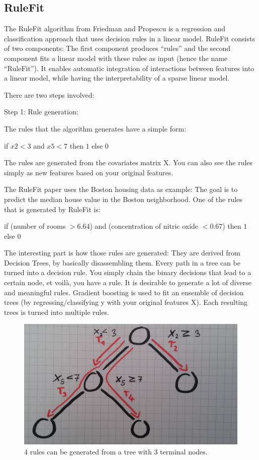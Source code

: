 \documentclass[12pt,]{krantz}
\theoremstyle{definition}
\theoremstyle{definition}
\theoremstyle{definition}
\theoremstyle{remark}
\begin{document}
\subsection{RuleFit}\label{rulefit}

The RuleFit algorithm from Friedman and Propescu
\citep{friedman2008predictive} is a regression and classification
approach that uses decision rules in a linear model. RuleFit consists of
two components: The first component produces ``rules'' and the second
component fits a linear model with these rules as input (hence the name
``RuleFit''). It enables automatic integration of interactions between
features into a linear model, while having the interpretability of a
sparse linear model.

There are two steps involved:

Step 1: Rule generation:

The rules that the algorithm generates have a simple form:

if \(x2 < 3\) and \(x5 < 7\) then \(1\) else \(0\)

The rules are generated from the covariates matrix X. You can also see
the rules simply as new features based on your original features.

The RuleFit paper uses the Boston housing data as example: The goal is
to predict the median house value in the Boston neighborhood. One of the
rules that is generated by RuleFit is:

if (number of rooms \(> 6.64\)) and (concentration of nitric oxide
\(< 0.67\)) then \(1\) else \(0\)

The interesting part is how those rules are generated: They are derived
from Decision Trees, by basically disassembling them. Every path in a
tree can be turned into a decision rule. You simply chain the binary
decisions that lead to a certain node, et voilà, you have a rule. It is
desirable to generate a lot of diverse and meaningful rules. Gradient
boosting is used to fit an ensemble of decision trees (by
regressing/classifying y with your original features X). Each resulting
trees is turned into multiple rules.

\begin{figure}
\includegraphics[width=0.8\linewidth]{images/rulefit} \caption{4 rules can be generated from a tree with 3 terminal nodes.}\label{fig:rulefit}
\end{figure}
\end{document}
